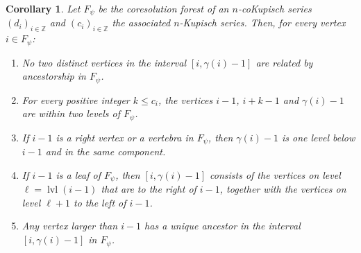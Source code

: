 \documentclass[a4paper]{amsart}
\newtheorem{corollary}[theorem]{Corollary}
\theoremstyle{definition}
\theoremstyle{remark}
\numberwithin{equation}{theorem}
\newcommand{\Z}{\mathbb{Z}}
\newcommand{\level}{\operatorname{lvl}}
\newcommand{\psiforest}{F_\psi}
\begin{document}
\begin{corollary}\label{S-lemma:corollaries}
    Let $ \psiforest $ be the coresolution forest of an $ n $-coKupisch series $(d_i)_{i\in\Z}$ and $(c_i)_{i\in\Z}$ the associated $ n $-Kupisch series. Then, for every vertex $ i \in \psiforest $:
    \begin{enumerate}
    \item\label{S-lemma:no:ancestors} No two distinct vertices in the interval $[i,\gamma(i)-1]$ are related by ancestorship in $ \psiforest $.
      \item\label{S-lemma:levels}
      For every positive integer $ k \leq c_i $, the vertices $i-1$, $i+k-1$ and $\gamma(i)-1$ are within two levels of $ \psiforest $.
     \item\label{lemma:right.vertex} If $ i-1 $ is a right vertex or a vertebra in $ \psiforest $, then $ \gamma(i)-1 $ is one level below $ i-1 $ and in the same component.
    \item\label{S-lemma:interval}
    If $i-1$ is a leaf of $ \psiforest $, then
      $[i, \gamma(i)-1]$
      consists of the vertices on level
      $\ell=\level(i-1)$ that are to the right of $i-1$, together
      with the vertices on level $\ell+1$ to
      the left of $i-1$.
    \item\label{S-lemma:ancestors} Any vertex larger than $i-1$ has a unique ancestor in the interval $[i,\gamma(i)-1] $ in $ \psiforest $.
    \end{enumerate}
\end{corollary}
\end{document}

